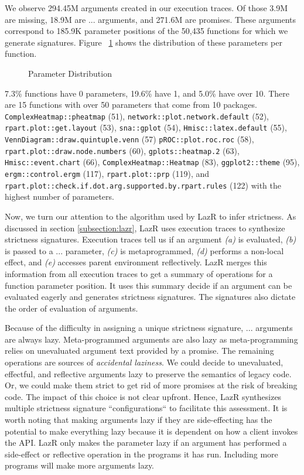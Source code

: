 \documentclass[review,nonacm,screen,acmsmall,anonymous=true]{acmart}
\renewcommand{\c}[1]{\lstinline |#1|\xspace}
\newcommand{\lazr}{{\sf LazR}\xspace}
\begin{document}
We observe 294.45M arguments created in our execution traces. Of those 3.9M are
missing, 18.9M are $...$ arguments, and 271.6M are promises. These arguments
correspond to 185.9K parameter positions of the 50,435 functions for which we
generate signatures. Figure ~\ref{fig:paramDist} shows the distribution of these
parameters per function.

\begin{figure}[!h]
  \centering
  
  \caption{Parameter Distribution}
  \label{fig:paramDist}
\end{figure}

7.3\% functions have 0 parameters, 19.6\% have 1, and 5.0\% have over 10. There
are 15 functions with over 50 parameters that come from 10 packages.
\c{ComplexHeatmap::pheatmap} (51), \c{network::plot.network.default} (52),
\c{rpart.plot::get.layout} (53), \c{sna::gplot} (54), \c{Hmisc::latex.default}
(55), \c{VennDiagram::draw.quintuple.venn} (57) \c{pROC::plot.roc.roc} (58),
\c{rpart.plot::draw.node.numbers} (60), \c{gplots::heatmap.2} (63),
\c{Hmisc::event.chart} (66), \c{ComplexHeatmap::Heatmap} (83),
\c{ggplot2::theme} (95), \c{ergm::control.ergm} (117), \c{rpart.plot::prp}
(119), and \c{rpart.plot::check.if.dot.arg.supported.by.rpart.rules} (122) with
the highest number of parameters.

Now, we turn our attention to the algorithm used by \lazr to infer strictness.
As discussed in section \ref{subsection:lazr}, \lazr uses execution traces to
synthesize strictness signatures. Execution traces tell us if an argument
\emph{(a)} is evaluated, \emph{(b)} is passed to a $...$ parameter, \emph{(c)}
is metaprogrammed, \emph{(d)} performs a non-local effect, and \emph{(e)}
accesses parent environment reflectively. \lazr merges this information from all
execution traces to get a summary of operations for a function parameter
position. It uses this summary decide if an argument can be evaluated eagerly
and generates strictness signatures. The signatures also dictate the order of
evaluation of arguments.

Because of the difficulty in assigning a unique strictness signature, $...$
arguments are always lazy. Meta-programmed arguments are also lazy as
meta-programming relies on unevaluated argument text provided by a promise. The
remaining operations are sources of \emph{accidental laziness}. We could decide
to unevaluated, effectful, and reflective arguments lazy to preserve the
semantics of legacy code. Or, we could make them strict to get rid of more
promises at the risk of breaking code. The impact of this choice is not clear
upfront. Hence, \lazr synthesizes multiple strictness signature
``configurations`` to facilitate this assessment. It is worth noting that making
arguments lazy if they are side-effecting has the potential to make everything
lazy because it is dependent on how a client invokes the API. \lazr only makes
the parameter lazy if an argument has performed a side-effect or reflective
operation in the programs it has run. Including more programs will make more
arguments lazy.
\end{document}
